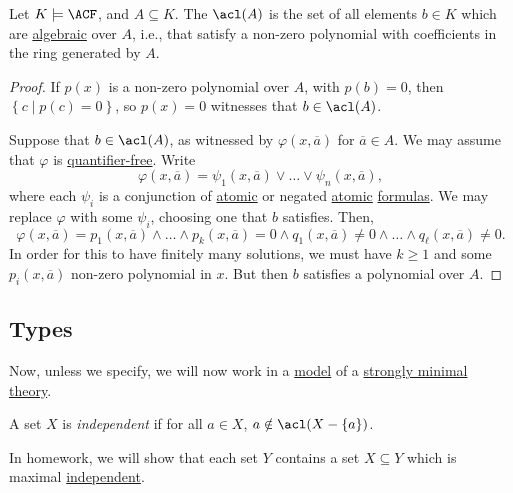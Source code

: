 \begin{theorem}
	Let \(K \models \ACF\), and \(A \subseteq K\). The \(\acl(A)\)  is the set of all elements \(b\in K\) which are \hyperref[def:algebraic]{algebraic} over \(A\), i.e., that satisfy a non-zero polynomial with coefficients in the ring generated by \(A\).
\end{theorem}
\begin{proof}
	If \(p(x)\) is a non-zero polynomial over \(A\), with \(p(b) = 0\), then \(\left\{ c \mid p(c) = 0 \right\} \), so \(p(x) = 0\) witnesses that \(b\in \acl(A)\).

	Suppose that \(b\in \acl(A)\), as witnessed by \(\varphi (x, \overline{a} )\) for \(\overline{a} \in A\). We may assume that \(\varphi \) is \hyperref[not:quantifier-free]{quantifier-free}. Write
	\[
		\varphi (x, \overline{a} ) = \psi _1(x, \overline{a} ) \lor \ldots \lor \psi _n(x, \overline{a} ),
	\]
	where each \(\psi _i\) is a conjunction of \hyperref[not:atomic]{atomic} or negated \hyperref[not:atomic]{atomic} \hyperref[def:formula]{formulas}. We may replace \(\varphi \) with some \(\psi _i\), choosing one that \(b\) satisfies. Then,
	\[
		\varphi (x, \overline{a} ) = p_1(x, \overline{a} ) \land \ldots \land p_k(x, \overline{a} ) = 0 \land q_1(x, \overline{a} ) \neq 0 \land \ldots \land q_{\ell}(x, \overline{a} ) \neq 0.
	\]
	In order for this to have finitely many solutions, we must have \(k \geq 1\) and some \(p_i(x, \overline{a} )\) non-zero polynomial in \(x\). But then \(b\) satisfies a polynomial over \(A\).
\end{proof}

\subsection{Types}
Now, unless we specify, we will now work in a \hyperref[def:model]{model} of a \hyperref[def:strongly-minimal]{strongly minimal} \hyperref[def:theory]{theory}.

\begin{definition}[Independent]\label{def:independent}
	A set \(X\) is \emph{independent} if for all \(a\in X\), \(a \notin \acl(X - \left\{ a \right\} )\).
\end{definition}

\begin{remark}
	In homework, we will show that each set \(Y\) contains a set \(X \subseteq Y\) which is maximal \hyperref[def:independent]{independent}.
\end{remark}

